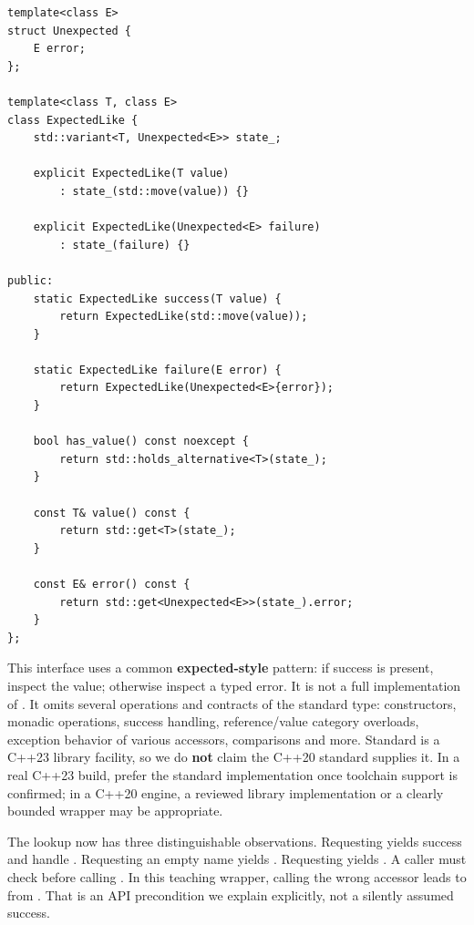 \begin{verbatim}
template<class E>
struct Unexpected {
    E error;
};

template<class T, class E>
class ExpectedLike {
    std::variant<T, Unexpected<E>> state_;

    explicit ExpectedLike(T value)
        : state_(std::move(value)) {}

    explicit ExpectedLike(Unexpected<E> failure)
        : state_(failure) {}

public:
    static ExpectedLike success(T value) {
        return ExpectedLike(std::move(value));
    }

    static ExpectedLike failure(E error) {
        return ExpectedLike(Unexpected<E>{error});
    }

    bool has_value() const noexcept {
        return std::holds_alternative<T>(state_);
    }

    const T& value() const {
        return std::get<T>(state_);
    }

    const E& error() const {
        return std::get<Unexpected<E>>(state_).error;
    }
};
\end{verbatim}

This interface uses a common \textbf{expected-style} pattern: if success is present, inspect the value; otherwise inspect a typed error. It is not a full implementation of . It omits several operations and contracts of the standard type: constructors, monadic operations,  success handling, reference/value category overloads, exception behavior of various accessors, comparisons and more. Standard  is a C++23 library facility, so we do \textbf{not} claim the C++20 standard supplies it. In a real C++23 build, prefer the standard implementation once toolchain support is confirmed; in a C++20 engine, a reviewed library implementation or a clearly bounded wrapper may be appropriate.

The lookup now has three distinguishable observations. Requesting  yields success and handle . Requesting an empty name yields . Requesting  yields . A caller must check  before calling . In this teaching wrapper, calling the wrong accessor leads to  from . That is an API precondition we explain explicitly, not a silently assumed success.

